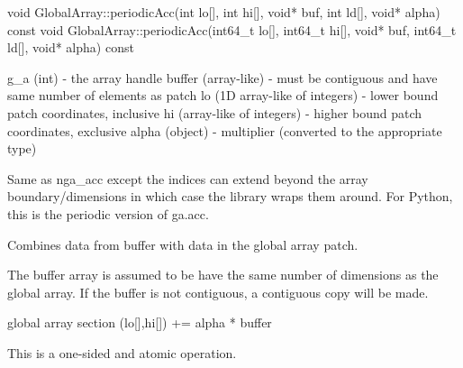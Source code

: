 \documentclass[12pt]{article}
\begin{document}
\begin{cxxapi}
\begin{cxxcode}
void GlobalArray::periodicAcc(int lo[], int hi[], void* buf,
                              int ld[], void* alpha) const
void GlobalArray::periodicAcc(int64_t lo[], int64_t hi[], void* buf,
                              int64_t ld[], void* alpha) const
\end{cxxcode}
\begin{funcargs}
\end{funcargs}
\end{cxxapi}

\begin{pyapi}
\begin{pycode}
   g_a (int)                      - the array handle
   buffer (array-like)            - must be contiguous and have same
                                    number of elements as patch
   lo (1D array-like of integers) - lower bound patch coordinates, inclusive
   hi (array-like of integers)    - higher bound patch coordinates, exclusive
   alpha (object)                 - multiplier (converted to the
                                    appropriate type)
\end{pycode}
\end{pyapi}
\ncoll

\begin{desc}

Same as nga_acc except the indices can extend beyond the array boundary/dimensions
in which case the library wraps them around. For Python, this is the periodic
version of ga.acc.

Combines data from buffer with data in the global array patch.

The buffer array is assumed to be have the same number of dimensions as the
global array. If the buffer is not contiguous, a contiguous copy will be made.

global array section (lo[],hi[]) += alpha * buffer

This is a one-sided and atomic operation.

\end{desc}

\end{document}
